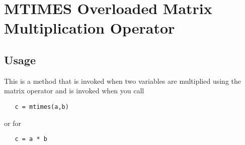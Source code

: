 \section{MTIMES Overloaded Matrix Multiplication Operator}

\subsection{Usage}

This is a method that is invoked when two variables are multiplied
using the matrix operator and is invoked when you call
\begin{verbatim}
   c = mtimes(a,b)
\end{verbatim}
or for
\begin{verbatim}
   c = a * b
\end{verbatim}
